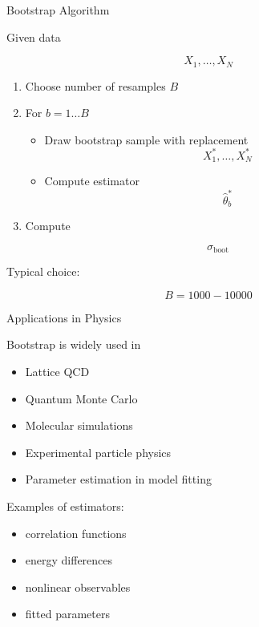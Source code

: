 \documentclass{beamer}
\begin{document}

\begin{frame}{Bootstrap Algorithm}

Given data

\[
X_1,\dots,X_N
\]

\begin{enumerate}

\item Choose number of resamples $B$

\item For $b=1\dots B$

\begin{itemize}

\item Draw bootstrap sample with replacement
\[
X_1^*,\dots,X_N^*
\]

\item Compute estimator
\[
\hat{\theta}_b^*
\]

\end{itemize}

\item Compute

\[
\sigma_{\text{boot}}
\]

\end{enumerate}

Typical choice:

\[
B = 1000 - 10000
\]
\end{frame}


\begin{frame}{Applications in Physics}

Bootstrap is widely used in

\begin{itemize}

\item Lattice QCD
\item Quantum Monte Carlo
\item Molecular simulations
\item Experimental particle physics
\item Parameter estimation in model fitting

\end{itemize}

Examples of estimators:

\begin{itemize}

\item correlation functions
\item energy differences
\item nonlinear observables
\item fitted parameters
\end{itemize}
\end{frame}
\end{document}
